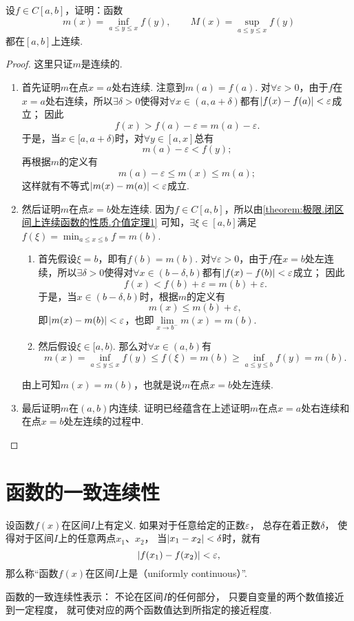 \begin{example}
设\(f \in C[a,b]\)，证明：函数\[
m(x) = \inf\limits_{a \leq y \leq x} f(y), \qquad
M(x) = \sup\limits_{a \leq y \leq x} f(y)
\]都在\([a,b]\)上连续.
\begin{proof}
这里只证\(m\)是连续的.
\begin{enumerate}
\item 首先证明\(m\)在点\(x=a\)处右连续.
注意到\(m(a) = f(a)\).
对\(\forall\varepsilon>0\)，由于\(f\)在\(x=a\)处右连续，所以\(\exists\delta>0\)使得对\(\forall x\in(a,a+\delta)\)都有\(\abs{f(x)-f(a)}<\varepsilon\)成立；
因此\[
f(x)
> f(a) - \varepsilon
= m(a) - \varepsilon.
\]
于是，当\(x\in[a,a+\delta)\)时，对\(\forall y\in[a,x]\)总有\[
m(a) - \varepsilon < f(y);
\]再根据\(m\)的定义有\[
m(a) - \varepsilon \leq m(x) \leq m(a);
\]这样就有不等式\(\abs{m(x)-m(a)}<\varepsilon\)成立.

\item 然后证明\(m\)在点\(x=b\)处左连续.
因为\(f \in C[a,b]\)，所以由\cref{theorem:极限.闭区间上连续函数的性质.介值定理1} 可知，\(\exists\xi\in[a,b]\)满足\(f(\xi) = \min_{a \leq x \leq b} f = m(b)\).
	\begin{enumerate}
	\item 首先假设\(\xi=b\)，即有\(f(b)=m(b)\).
	对\(\forall\varepsilon>0\)，由于\(f\)在\(x=b\)处左连续，所以\(\exists\delta>0\)使得对\(\forall x\in(b-\delta,b)\)都有\(\abs{f(x)-f(b)}<\varepsilon\)成立；
	因此\[
	f(x)
	< f(b) + \varepsilon
	= m(b) + \varepsilon.
	\]
	于是，当\(x\in(b-\delta,b)\)时，根据\(m\)的定义有\[
	m(x) \leq m(b) + \varepsilon,
	\]
	即\(\abs{m(x)-m(b)}<\varepsilon\)，也即\(\lim\limits_{x \to b^-} m(x) = m(b)\).

	\item 然后假设\(\xi\in[a,b)\).
	那么对\(\forall x\in(a,b)\)有\[
	m(x) = \inf\limits_{a \leq y \leq x} f(y)
	\leq f(\xi)
	= m(b)
	\geq \inf\limits_{a \leq y \leq b} f(y)
	= m(b).
	\]
	\end{enumerate}
	由上可知\(m(x) = m(b)\)，也就是说\(m\)在点\(x=b\)处左连续.

\item 最后证明\(m\)在\((a,b)\)内连续.
证明已经蕴含在上述证明\(m\)在点\(x=a\)处右连续和在点\(x=b\)处左连续的过程中.
\qedhere
\end{enumerate}
\end{proof}
\end{example}

\section{函数的一致连续性}
\begin{definition}\label{definition:极限.函数的一致连续性}
设函数\(f(x)\)在区间\(I\)上有定义.
如果对于任意给定的正数\(\varepsilon\)，
总存在着正数\(\delta\)，
使得对于区间\(I\)上的任意两点\(x_1\)、\(x_2\)，
当\(\abs{x_1 - x_2} < \delta\)时，就有\[
	\abs{f(x_1) - f(x_2)} < \varepsilon,
\]
那么称“函数\(f(x)\)在区间\(I\)上是（uniformly continuous）”.
\end{definition}
函数的一致连续性表示：
不论在区间\(I\)的任何部分，
只要自变量的两个数值接近到一定程度，
就可使对应的两个函数值达到所指定的接近程度.

